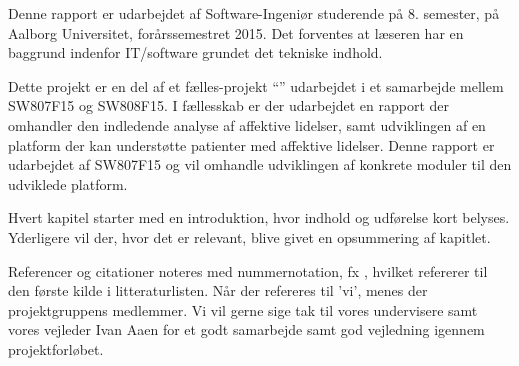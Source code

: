 Denne rapport er udarbejdet af Software-Ingeniør studerende på 8. semester, på Aalborg Universitet, forårssemestret 2015.
Det forventes at læseren har en baggrund indenfor IT/software grundet det tekniske indhold.

Dette projekt er en del af et fælles-projekt ``''\cite{faelles} udarbejdet i et samarbejde mellem SW807F15 og SW808F15.
I fællesskab er der udarbejdet en rapport der omhandler den indledende analyse af affektive lidelser, samt udviklingen af en platform der kan understøtte patienter med affektive lidelser.
Denne rapport er udarbejdet af SW807F15 og vil omhandle udviklingen af konkrete moduler til den udviklede platform.

Hvert kapitel starter med en introduktion, hvor indhold og udførelse kort belyses.
Yderligere vil der, hvor det er relevant, blive givet en opsummering af kapitlet.

Referencer og citationer noteres med nummernotation, fx \cite{faelles}, hvilket refererer til den første kilde i litteraturlisten.
Når der refereres til 'vi', menes der projektgruppens medlemmer.
\newline
\newline
Vi vil gerne sige tak til vores undervisere samt vores vejleder Ivan Aaen for et godt samarbejde samt god vejledning igennem projektforløbet.